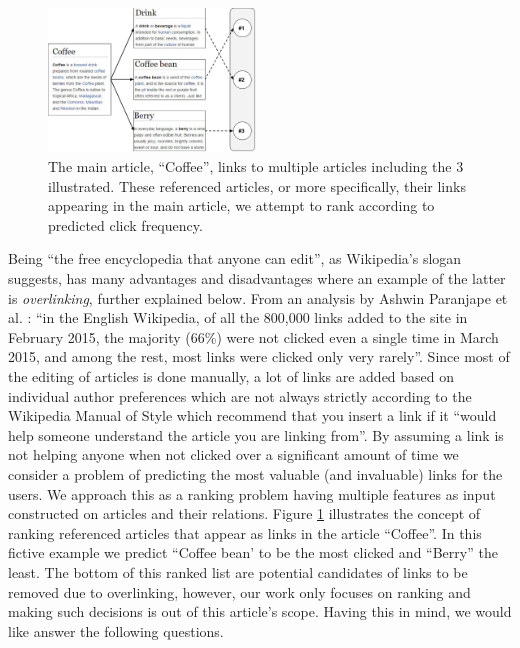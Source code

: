 \begin{figure}[H]
\centering
\includegraphics[width=0.49\textwidth]{images/concept}
	\caption{The main article, ``Coffee'', links to multiple articles including the 3 illustrated. These referenced articles, or more specifically, their links appearing in the main article, we attempt to rank according to predicted click frequency.} 
 \label{fig:concept}
\end{figure}
%
%
Being ``the free encyclopedia that anyone can edit'', as Wikipedia's slogan suggests, has many advantages and disadvantages where an example of the latter is \textit{overlinking}, further explained below. From an analysis by Ashwin Paranjape et al. \cite{paranjape}:  ``in the English Wikipedia, of all the 800,000 links added to the site in February 2015, the majority (66\%) were not clicked even a single time in March 2015, and among the rest, most links were clicked only very rarely''. Since most of the editing of articles is done manually, a lot of links are added based on individual author preferences which are not always strictly according to the Wikipedia Manual of Style \cite{lead} which recommend that you insert a link if it ``would help someone understand the article you are linking from''. 
%
%
By assuming a link is not helping anyone when not clicked over a significant amount of time we consider a problem of predicting the most valuable (and invaluable) links for the users. We approach this as a ranking problem having multiple features as input constructed on articles and their relations. Figure \ref{fig:concept} illustrates the concept of ranking referenced articles that appear as links in the article ``Coffee''. In this fictive example we predict ``Coffee bean' to be the most clicked and ``Berry'' the least. The bottom of this ranked list are potential candidates of links to be removed due to overlinking, however, our work only focuses on ranking and making such decisions is out of this article's scope. Having this in mind, we would like answer the following questions.
